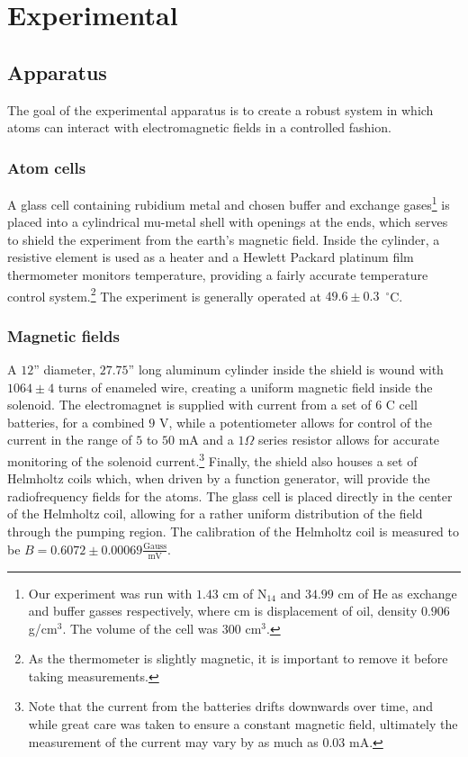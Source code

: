 
\section{Experimental}\label{experimental}

\subsection{Apparatus}\label{apparatus}

The goal of the experimental apparatus is to create a robust system in which atoms can interact with electromagnetic fields in a controlled fashion. 

\subsubsection{Atom cells}
A glass cell containing rubidium metal and chosen buffer and exchange gases\footnote{Our experiment was run with $1.43$ cm of N$_{14}$ and $34.99$ cm of He as exchange and buffer gasses respectively, where cm is displacement of oil, density $0.906$ g/cm$^{3}$. The volume of the cell was $300$ cm$^{3}$.} is placed into a cylindrical mu-metal shell with openings at the ends, which serves to shield the experiment from the earth's magnetic field. Inside the cylinder, a resistive element is used as a heater and a Hewlett Packard platinum film thermometer monitors temperature, providing a fairly accurate temperature control system.\footnote{As the thermometer is slightly magnetic, it is important to remove it before taking measurements.} The experiment is generally operated at $49.6\pm0.3$~$^{\circ}$C.

\subsubsection{Magnetic fields}

A $12$'' diameter, $27.75$'' long aluminum cylinder inside the shield is wound with $1064\pm4$ turns of enameled wire, creating a uniform magnetic field inside the solenoid. The electromagnet is supplied with current from a set of $6$ C cell batteries, for a combined $9$ V, while a potentiometer allows for control of the current in the range of $5$ to $50$ mA and a $1 \Omega$ series resistor allows for accurate monitoring of the solenoid current.\footnote{Note that the current from the batteries drifts downwards over time, and while great care was taken to ensure a constant magnetic field, ultimately the measurement of the current may vary by as much as $0.03$ mA.} Finally, the shield also houses a set of Helmholtz coils which, when driven by a function generator, will provide the radiofrequency fields for the atoms. The glass cell is placed directly in the center of the Helmholtz coil, allowing for a rather uniform distribution of the field through the pumping region. The calibration of the Helmholtz coil is measured to be $B =0.6072\pm0.00069\frac{\mathrm{Gauss}}{\mathrm{mV}}$.

